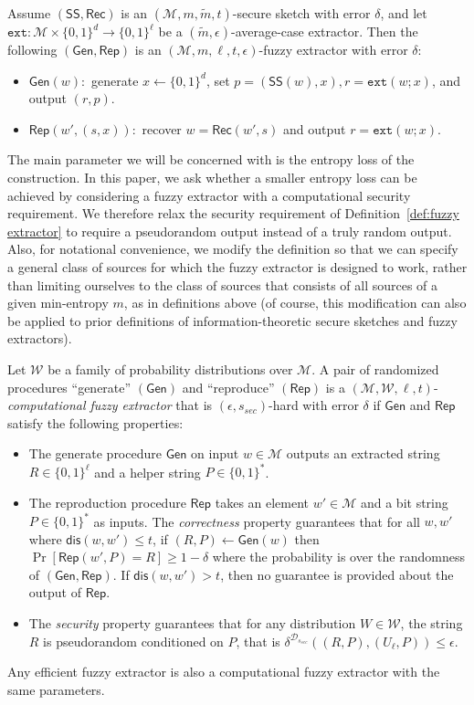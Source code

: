 \documentclass{llncs}
\newcommand{\defref}[1]{\mbox{Definition~\ref{#1}}}
\newcommand{\class}[1]{{\ensuremath{\mathsf{#1}}}}
\newcommand{\gen}{\ensuremath{\class{Gen}}\xspace}
\newcommand{\rep}{\ensuremath{\class{Rep}}\xspace}
\newcommand{\sketch}{\ensuremath{\class{SS}}\xspace}
\newcommand{\rec}{\ensuremath{\class{Rec}}\xspace}
\newcommand{\zo}{\ensuremath{\{0, 1\}}}
\newcommand{\dis}{\ensuremath{\mathsf{dis}}}
\newcommand{\ext}{\ensuremath{\mathtt{ext}}}
\begin{document}
\begin{lemma}
\label{lem:fuzzy ext construction}
Assume $(\sketch, \rec)$ is an $(\mathcal{M}, m, \tilde{m}, t)$-secure sketch with error $\delta$, and let $\ext:\mathcal{M}\times \zo^d \rightarrow \zo^\ell$ be a $(\tilde{m}, \epsilon)$-average-case extractor.  Then the following $(\gen, \rep)$ is an $(\mathcal{M}, m, \ell, t, \epsilon)$-fuzzy extractor with error $\delta$:
\begin{itemize}
\item $\gen(w):$ generate $x\leftarrow \zo^d$, set $p=(\sketch(w), x), r=\ext(w;x)$, and output $(r,p)$.
\item $\rep(w', (s, x)):$ recover $w=\rec(w',s)$ and output $r=\ext(w;x)$.
\end{itemize}
\end{lemma}
The main parameter we will be concerned with is the entropy loss of the construction.  In this paper, we ask whether a smaller entropy loss can be achieved by considering a fuzzy extractor with a computational security requirement.  We therefore relax the security requirement of \defref{def:fuzzy extractor} to require a pseudorandom output instead of a truly random output.  Also, for notational convenience, we modify the definition so that we can specify a general class of sources for which the fuzzy extractor is designed to work, rather than limiting ourselves to the class of sources that consists of all sources of a given min-entropy $m$, as in definitions above (of course, this modification can also be applied to prior definitions of information-theoretic secure sketches and fuzzy extractors).

\begin{definition}\label{def:comp fuzzy extractor}
Let $\mathcal{W}$ be a family of probability distributions over $\mathcal{M}$. A pair of randomized procedures ``generate'' $(\gen)$ and ``reproduce'' $(\rep)$ is a $(\mathcal{M}, \mathcal{W}, \ell, t)$-\emph{computational fuzzy extractor} that is $(\epsilon, s_{sec})$-hard with error $\delta$ if \gen and \rep satisfy the following properties:
\begin{itemize}
\item The generate procedure \gen on input $w\in \mathcal{M}$ outputs an extracted string $R\in\{0,1\}^\ell$ and a helper string $P\in\{0,1\}^*$.
\item The reproduction procedure \rep takes an element $w'\in\mathcal{M}$ and a bit string $P\in\{0,1\}^*$ as inputs.  The \emph{correctness} property guarantees that for all $w, w'$ where $\dis(w, w')\leq t$, if $(R, P)\leftarrow \gen(w)$ then $\Pr[\rep( w', P) = R] \geq 1-\delta$ where the probability is over the randomness of $(\gen, \rep)$.  
If $\dis(w, w') > t$, then no guarantee is provided about the output of \rep.
\item The \emph{security} property guarantees that for any distribution $W\in \mathcal{W}$, the string $R$ is pseudorandom conditioned on $P$, that is $\delta^{\mathcal{D}_{s_{sec}}}((R, P), (U_\ell, P))\leq \epsilon$.
\end{itemize}
\end{definition}
Any efficient fuzzy extractor is also a computational fuzzy extractor with the same parameters.
\end{document}

